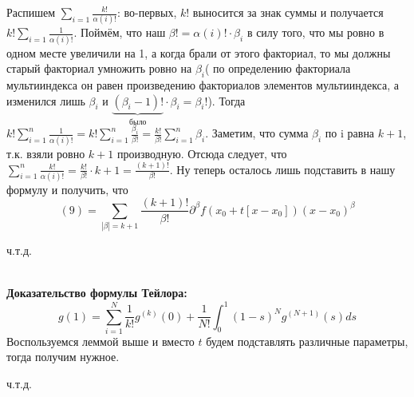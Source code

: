 \documentclass[book, 11pt]{report}
\begin{document}
{        Распишем $\displaystyle\sum_{i=1}\frac{k!}{\alpha(i)!}$: во-первых, $k!$ выносится за знак суммы и получается $\displaystyle k!\sum_{i=1}\frac{1}{\alpha(i)!}$. Поймём, что наш $\beta!=\alpha(i)!\cdot\beta_i$ в силу того, что мы ровно в одном месте увеличили на 1, а когда брали от этого факториал, то мы должны старый факториал умножить ровно на $\beta_i$( по определению факториала мультииндекса он равен произведению факториалов элементов мультииндекса, а изменился лишь $\beta_i$ и $\displaystyle\underbrace{(\beta_i-1)!}_{\text{было}}\cdot\beta_i=\beta_i!$). Тогда $\displaystyle k!\sum_{i=1}^n\frac{1}{\alpha(i)!}=k!\sum_{i=1}^n\frac{\beta_i}{\beta!}=\frac{k!}{\beta!}\sum_{i=1}^{n}\beta_i$. Заметим, что сумма $\beta_i$ по i равна $k+1$, т.к. взяли ровно $k+1$ производную. Отсюда следует, что $\displaystyle\sum_{i=1}^n\frac{k!}{\alpha(i)!}=\frac{k!}{\beta!}\cdot k+1=\frac{(k+1)!}{\beta!}$. Ну теперь осталось лишь подставить в нашу формулу и получить, что 
        \begin{equation}
	       (9)=\sum_{|\beta|=k+1}\frac{(k+1)!}{\beta!}\partial^{\beta}f(x_0+t[x-x_0])(x-x_0)^{\beta}
        \end{equation}
        }
    \par{{\raggedleft ч.т.д.\par}}
    \setcounter{equation}{0}
    \par{
    \text{\ }\\
    \textbf{Доказательство формулы Тейлора:}\\
    \begin{equation*}
        g(1) = \sum_{i=1}^N\frac{1}{k!}g^{(k)}(0)+\frac{1}{N!}\int_{0}^1(1-s)^Ng^{(N+1)}(s)ds
    \end{equation*}
    Воспользуемся леммой выше и вместо $t$ будем подставлять различные параметры, тогда получим нужное.
    }
    \par{{\raggedleft ч.т.д.\par}}
    \vspace{0.5cm}
\end{document}
